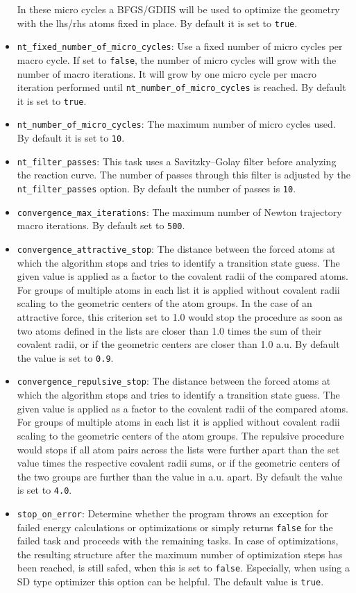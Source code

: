 \documentclass[]{tufte-book}
\begin{document}
\begin{itemize}
In these micro cycles a BFGS/GDIIS will be used to optimize the geometry with the lhs/rhs atoms fixed in place.
By default it is set to \texttt{true}.
\item \texttt{nt\_fixed\_number\_of\_micro\_cycles}: Use a fixed number of micro cycles per macro cycle. If set to
\texttt{false}, the number of micro cycles will grow with the number of macro iterations. It will grow by one micro
cycle per macro iteration performed until \texttt{nt\_number\_of\_micro\_cycles} is reached. By default it is set to \texttt{true}.
\item \texttt{nt\_number\_of\_micro\_cycles}: The maximum number of micro cycles used. By default it is set to \texttt{10}.
\item \texttt{nt\_filter\_passes}: This task uses a Savitzky--Golay filter before analyzing the reaction curve. The number of passes
through this filter is adjusted by the \texttt{nt\_filter\_passes} option. By default the number of passes is \texttt{10}.
\item \texttt{convergence\_max\_iterations}: The maximum number of Newton trajectory macro iterations. By default set to \texttt{500}.
\item \texttt{convergence\_attractive\_stop}: The distance between the forced atoms at which the algorithm stops and tries to identify
a transition state guess. The given value is applied as a factor to the covalent radii of the compared atoms.
For groups of multiple atoms in each list it is applied without covalent radii scaling to the geometric centers of the atom groups.
In the case of an attractive force, this criterion set to 1.0 would stop the procedure as soon as two atoms defined in the lists
are closer than 1.0 times the sum of their covalent radii, or if the geometric centers are closer than 1.0 a.u.
By default the value is set to \texttt{0.9}.
\item \texttt{convergence\_repulsive\_stop}: The distance between the forced atoms at which the algorithm stops and tries to identify
a transition state guess. The given value is applied as a factor to the covalent radii of the compared atoms.
For groups of multiple atoms in each list it is applied without covalent radii scaling to the geometric centers of the atom groups.
The repulsive procedure would stops if all atom pairs across the lists were further apart than the set value times the respective
covalent radii sums, or if the geometric centers of the two groups are further than the value in a.u. apart.
By default the value is set to \texttt{4.0}.
\item \texttt{stop\_on\_error}: Determine whether the program throws an exception for failed energy calculations or optimizations or simply returns \texttt{false} for the failed task and proceeds with the remaining tasks. In case of optimizations, the resulting structure after the maximum number of optimization steps has been reached, is still safed, when this is set to \texttt{false}. Especially, when using a SD type optimizer this option can be helpful. The default value is \texttt{true}.

\end{itemize}
\end{document}
